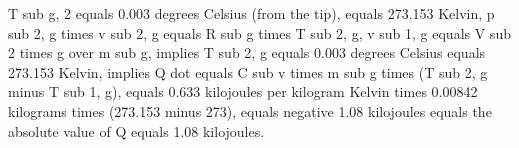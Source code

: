 T sub g, 2 equals 0.003 degrees Celsius (from the tip),
equals 273.153 Kelvin,
p sub 2, g times v sub 2, g equals R sub g times T sub 2, g,
v sub 1, g equals V sub 2 times g over m sub g,
implies T sub 2, g equals 0.003 degrees Celsius equals 273.153 Kelvin,
implies Q dot equals C sub v times m sub g times (T sub 2, g minus T sub 1, g),
equals 0.633 kilojoules per kilogram Kelvin times 0.00842 kilograms times (273.153 minus 273),
equals negative 1.08 kilojoules equals the absolute value of Q equals 1.08 kilojoules.